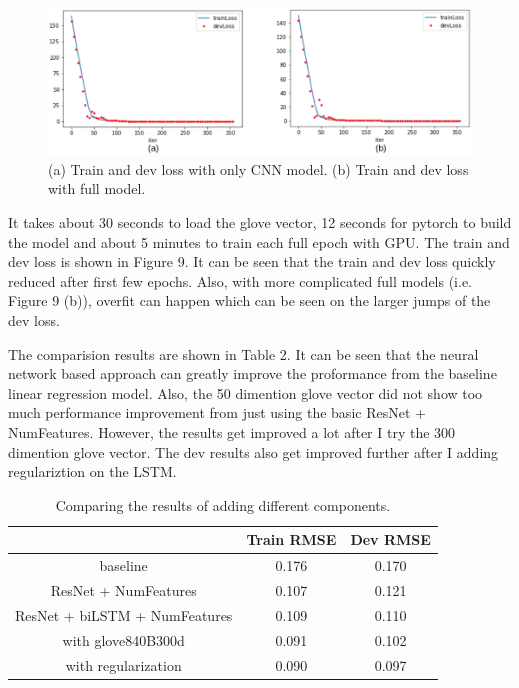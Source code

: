 \documentclass{article} %
\begin{document}
\begin{figure}[h]
	\begin{center}
		\includegraphics[width=0.8\linewidth]{fig/loss2.png}
	\end{center}
	\caption{(a) Train and dev loss with only CNN model. (b) Train and dev loss with full model.}
	\label{fig:long}
	\label{fig:onecol}
\end{figure}

It takes about 30 seconds to load the glove vector, 12 seconds for pytorch to build the model
and about 5 minutes to train each full epoch with GPU.
The train and dev loss is shown in Figure 9.
It can be seen that the train and dev loss quickly reduced after first few epochs.
Also, with more complicated full models (i.e. Figure 9 (b)),
overfit can happen which can be seen on the larger jumps of the dev loss.

The comparision results are shown in Table 2.
It can be seen that the neural network based approach 
can greatly improve the proformance from the baseline linear regression model.
Also, the 50 dimention glove vector did not show too much performance improvement
from just using the basic ResNet + NumFeatures.
However, the results get improved a lot after I try the 300 dimention glove vector.
The dev results also get improved further after I adding regulariztion on the LSTM.

\begin{table}
	\label{sample-table2}
	\begin{center}
		\begin{tabular}{|c|cc|}
			\hline
			\multicolumn{1}{|c|}{}  &\multicolumn{1}{c}{\bf Train RMSE} &\multicolumn{1}{c|}{\bf Dev RMSE} \\ 
			\hline
			baseline                                                   &0.176 &0.170\\
			ResNet + NumFeatures           					&0.107 &0.121\\
			ResNet + biLSTM + NumFeatures           &0.109 &0.110\\	
			with glove840B300d             &0.091 &0.102\\
			with regularization             	&0.090 &0.097\\
			\hline
		\end{tabular}
	\end{center}
	\caption{Comparing the results of adding different components.}
\end{table}
\end{document}
